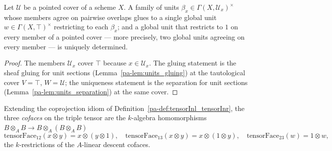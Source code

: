 \begin{theorem}
  \label{pa-thm:exists_global_unit_of_compatible}
  \leanok

  Let \(\mathcal U\) be a pointed cover of a scheme \(X\).  A family of units \(\beta_x \in
  \Gamma(X, \mathcal U_x)^{\times}\) whose members agree on pairwise overlaps glues to a single
  global unit \(w \in \Gamma(X, \top)^{\times}\) restricting to each \(\beta_x\); and a global
  unit that restricts to \(1\) on every member of a pointed cover — more precisely, two global
  units agreeing on every member — is uniquely determined.
\end{theorem}
\begin{proof}
  \leanok
  The members \(\mathcal U_x\) cover \(\top\) because \(x \in \mathcal U_x\).  The gluing
  statement is the sheaf gluing for unit sections (Lemma~\ref{pa-lem:units_gluing}) at the
  tautological cover \(V = \top\), \(W = \mathcal U\); the uniqueness statement is the
  separation for unit sections (Lemma~\ref{pa-lem:units_separation}) at the same cover.
\end{proof}

\begin{definition}
  \label{pa-def:tensorFaces}
  \leanok

  Extending the coprojection idiom of Definition~\ref{pa-def:tensorInl_tensorInr}, the three
  \emph{cofaces} on the triple tensor are the \(k\)-algebra homomorphisms \(B \otimes_A B \to B
  \otimes_A (B \otimes_A B)\)
  \[
    \mathrm{tensorFace}_{12}(x \otimes y) = x \otimes (y \otimes 1), \quad
    \mathrm{tensorFace}_{13}(x \otimes y) = x \otimes (1 \otimes y), \quad
    \mathrm{tensorFace}_{23}(w) = 1 \otimes w,
  \]
  the \(k\)-restrictions of the \(A\)-linear descent cofaces.
\end{definition}

